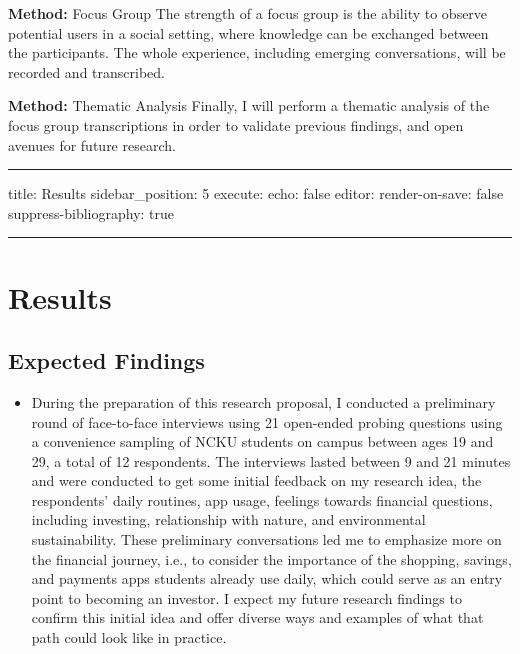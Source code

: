 \documentclass[
  letterpaper,
  DIV=11,
  numbers=noendperiod]{scrartcl}
\providecommand{\tightlist}{%
  \setlength{\itemsep}{0pt}\setlength{\parskip}{0pt}}\usepackage{longtable,booktabs,array}
\begin{document}
\textbf{Method:} Focus Group The strength of a focus group is the
ability to observe potential users in a social setting, where knowledge
can be exchanged between the participants. The whole experience,
including emerging conversations, will be recorded and transcribed.

\textbf{Method:} Thematic Analysis Finally, I will perform a thematic
analysis of the focus group transcriptions in order to validate previous
findings, and open avenues for future research.

\newpage

\begin{center}\rule{0.5\linewidth}{0.5pt}\end{center}

title: Results sidebar\_position: 5 execute: echo: false editor:
render-on-save: false suppress-bibliography: true

\begin{center}\rule{0.5\linewidth}{0.5pt}\end{center}

\section{Results}\label{results}

\subsection{Expected Findings}\label{expected-findings}

\begin{itemize}
\tightlist
\item
  During the preparation of this research proposal, I conducted a
  preliminary round of face-to-face interviews using 21 open-ended
  probing questions using a convenience sampling of NCKU students on
  campus between ages 19 and 29, a total of 12 respondents. The
  interviews lasted between 9 and 21 minutes and were conducted to get
  some initial feedback on my research idea, the respondents' daily
  routines, app usage, feelings towards financial questions, including
  investing, relationship with nature, and environmental sustainability.
  These preliminary conversations led me to emphasize more on the
  financial journey, i.e., to consider the importance of the shopping,
  savings, and payments apps students already use daily, which could
  serve as an entry point to becoming an investor. I expect my future
  research findings to confirm this initial idea and offer diverse ways
  and examples of what that path could look like in practice.
\end{itemize}
\end{document}
